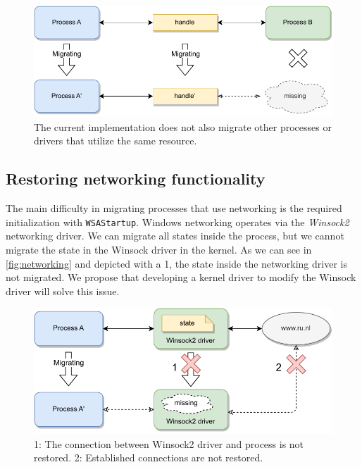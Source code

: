 \documentclass[a4paper, 11pt, english]{report}
\begin{document}
\begin{figure}[h]
	\centerline{\includegraphics[width=\textwidth]{images/missing other end.drawio.pdf}}
	\label{fig:missing-end}
	\caption{The current implementation does not also migrate other processes or drivers that utilize the same resource.}
\end{figure}

\subsection{Restoring networking functionality}
\label{sec:handles-network-handles}
The main difficulty in migrating processes that use networking is the required initialization with \texttt{WSAStartup}. Windows networking operates via the \textit{Winsock2} networking driver. We can migrate all states inside the process, but we cannot migrate the state in the Winsock driver in the kernel. As we can see in \autoref{fig:networking} and depicted with a 1, the state inside the networking driver is not migrated. We propose that developing a kernel driver to modify the Winsock driver will solve this issue.

\begin{figure}[h]
	\includegraphics[width=\textwidth]{images/networking.drawio.pdf}
	
	\caption{1: The connection between Winsock2 driver and process is not restored. 2: Established connections are not restored.}
	\label{fig:networking}
\end{figure}
\end{document}
